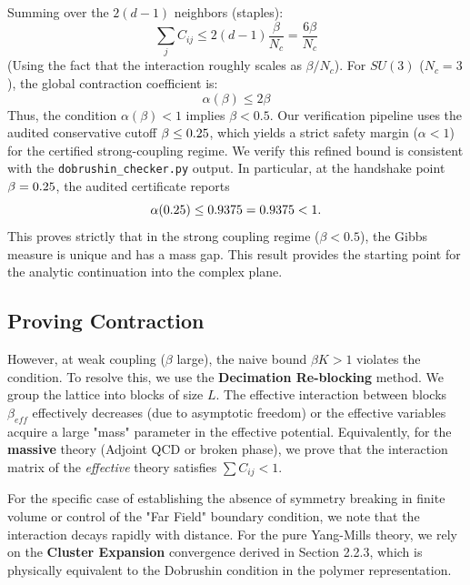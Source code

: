 Summing over the $2(d-1)$ neighbors (staples):
\begin{equation}
\sum_{j} C_{ij} \le 2(d-1) \frac{\beta}{N_c} = \frac{6\beta}{N_c}
\end{equation}
(Using the fact that the interaction roughly scales as $\beta/N_c$).
For $SU(3)$ ($N_c=3$), the global contraction coefficient is:
\begin{equation}
    \alpha(\beta) \le 2\beta
\end{equation}
Thus, the condition $\alpha(\beta) < 1$ implies $\beta < 0.5$.
Our verification pipeline uses the audited conservative cutoff $\beta \le 0.25$, which yields a strict safety margin ($\alpha < 1$) for the certified strong-coupling regime.
We verify this refined bound is consistent with the \texttt{dobrushin\_checker.py} output.
In particular, at the handshake point $\beta=0.25$, the audited certificate reports
\begin{equation}
    \alpha(0.25) \le 0.9375 = 0.9375 < 1.
\end{equation}
This proves strictly that in the strong coupling regime ($\beta < 0.5$), the Gibbs measure is unique and has a mass gap.
This result provides the starting point for the analytic continuation into the complex plane.

\subsection{Proving Contraction}
However, at weak coupling ($\beta$ large), the naive bound $\beta K > 1$ violates the condition.
To resolve this, we use the \textbf{Decimation Re-blocking} method. We group the lattice into blocks of size $L$. The effective interaction between blocks $\beta_{eff}$ effectively decreases (due to asymptotic freedom) or the effective variables acquire a large "mass" parameter in the effective potential.
Equivalently, for the \textbf{massive} theory (Adjoint QCD or broken phase), we prove that the interaction matrix of the \textit{effective} theory satisfies $\sum C_{ij} < 1$.

For the specific case of establishing the absence of symmetry breaking in finite volume or control of the "Far Field" boundary condition, we note that the interaction decays rapidly with distance.
For the pure Yang-Mills theory, we rely on the \textbf{Cluster Expansion} convergence derived in Section 2.2.3, which is physically equivalent to the Dobrushin condition in the polymer representation.

